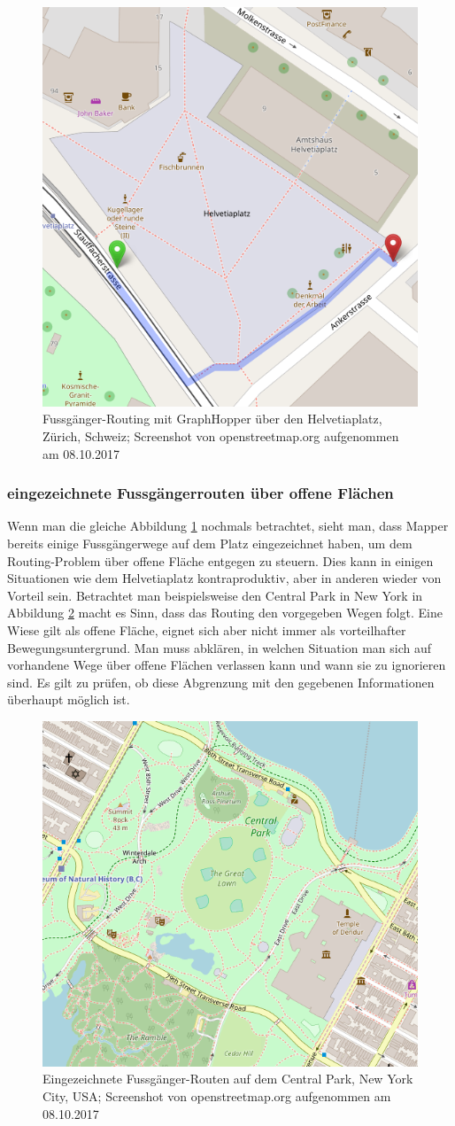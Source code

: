\begin{figure}[ht]
	\centering
	\includegraphics[width=0.5\linewidth]{technicalreport/img/helvetiaplatz_graphhopper}
	\caption[Fussgänger-Routing]{Fussgänger-Routing mit GraphHopper \cite{graphhopper} über den Helvetiaplatz, Zürich, Schweiz; Screenshot von openstreetmap.org aufgenommen am 08.10.2017}
	\label{fig:helvetiaplatz_graphhopper}
\end{figure}

\subsubsection{eingezeichnete Fussgängerrouten über offene Flächen}
\label{problem:eingezeichnete Fussgängerrouten über offene Flächen}
Wenn man die gleiche Abbildung \ref{fig:helvetiaplatz_graphhopper} nochmals betrachtet, sieht man, dass Mapper bereits einige Fussgängerwege auf dem Platz eingezeichnet haben, um dem Routing-Problem über offene Fläche entgegen zu steuern. Dies kann in einigen Situationen wie dem Helvetiaplatz kontraproduktiv, aber in anderen wieder von Vorteil sein. Betrachtet man beispielsweise den Central Park in New York in Abbildung \ref{fig:central_park} macht es Sinn, dass das Routing den vorgegeben Wegen folgt. Eine Wiese gilt als offene Fläche, eignet sich aber nicht immer als vorteilhafter Bewegungsuntergrund. Man muss abklären, in welchen Situation man sich auf vorhandene Wege über offene Flächen verlassen kann und wann sie zu ignorieren sind. Es gilt zu prüfen, ob diese Abgrenzung mit den gegebenen Informationen überhaupt möglich ist.

\begin{figure}[ht]
\centering
\includegraphics[width=0.5\linewidth]{technicalreport/img/central_park}
\caption[eingezeichnete Fussgänger-Routen]{Eingezeichnete Fussgänger-Routen auf dem Central Park, New York City, USA; Screenshot von openstreetmap.org aufgenommen am 08.10.2017}
\label{fig:central_park}
\end{figure}

